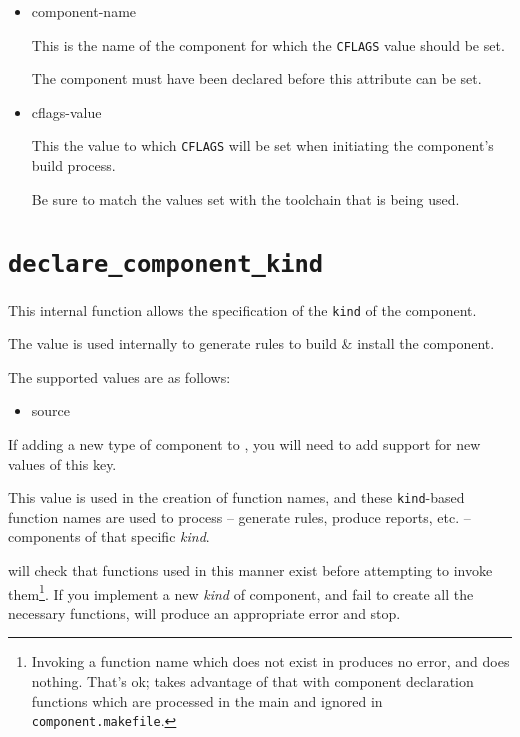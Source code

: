 \begin{itemize}
\item component-name

  This is the name of the component for which the \texttt{CFLAGS}
  value should be set.

  The component must have been declared before this attribute can be
  set.

\item cflags-value

  This the value to which \texttt{CFLAGS} will be set when initiating
  the component's build process.

  Be sure to match the values set with the toolchain that is being
  used.

\end{itemize}

\section{\texttt{declare\_component\_kind}}\label{api:kind}

This internal function allows the specification of the \texttt{kind}
of the component.

The value is used internally to generate \make rules to build \&
install the component.

The supported values are as follows:

\begin{itemize}
\item source
\end{itemize}

If adding a new type of component to \lmsbw, you will need to add
support for new values of this key.

This value is used in the creation of function names, and these
\texttt{kind}-based function names are used to process -- generate
rules, produce reports, etc. -- components of that specific
\emph{kind}.

\lmsbw will check that functions used in this manner exist before
attempting to invoke them\footnote{Invoking a function name which does
  not exist in \gnumake produces no error, and does nothing.  That's
  ok; \lmsbw takes advantage of that with component declaration
  functions which are processed in the main \makefile and ignored in
  \texttt{component.makefile}.}.  If you implement a new \emph{kind}
of component, and fail to create all the necessary functions, \lmsbw
will produce an appropriate error and stop.

